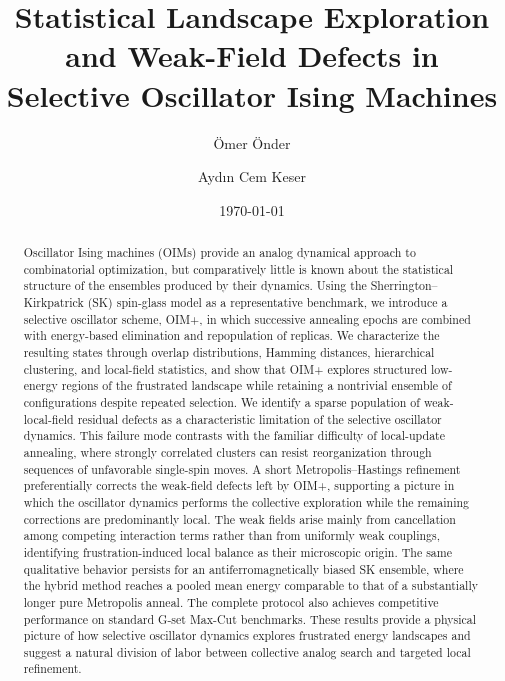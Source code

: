 \documentclass[
reprint,
amsmath,amssymb,
aps,
pre,
floatfix,
]{revtex4-2}
\begin{document}

\title{Statistical Landscape Exploration and Weak-Field Defects in Selective Oscillator Ising Machines}

\author{Ömer Önder}
%
\author{Aydın Cem Keser}%

%

\date{\today}%

\begin{abstract}
Oscillator Ising machines (OIMs) provide an analog dynamical approach to
combinatorial optimization, but comparatively little is known about the
statistical structure of the ensembles produced by their dynamics. Using
the Sherrington--Kirkpatrick (SK) spin-glass model as a representative benchmark,
we introduce a selective oscillator scheme, OIM+, in which successive
annealing epochs are combined with energy-based elimination and
repopulation of replicas. We characterize the resulting states through
overlap distributions, Hamming distances, hierarchical clustering, and
local-field statistics, and show that OIM+ explores structured low-energy
regions of the frustrated landscape while retaining a nontrivial ensemble
of configurations despite repeated selection.
We identify a sparse population of weak-local-field residual defects as a
characteristic limitation of the selective oscillator dynamics. This
failure mode contrasts with the familiar difficulty of local-update
annealing, where strongly correlated clusters can resist reorganization
through sequences of unfavorable single-spin moves. A short
Metropolis--Hastings refinement preferentially corrects the weak-field
defects left by OIM+, supporting a picture in which the oscillator dynamics performs the collective exploration while the remaining corrections are predominantly local. The weak fields arise mainly from cancellation among
competing interaction terms rather than from uniformly weak couplings,
identifying frustration-induced local balance as their microscopic origin.
The same qualitative behavior persists for an antiferromagnetically biased
SK ensemble, where the hybrid method reaches a pooled mean energy comparable
to that of a substantially longer pure Metropolis anneal. The complete
protocol also achieves competitive performance on standard G-set Max-Cut
benchmarks. These results provide a physical picture of how selective
oscillator dynamics explores frustrated energy landscapes and suggest a
natural division of labor between collective analog search and targeted
local refinement.
\end{abstract}
\end{document}
